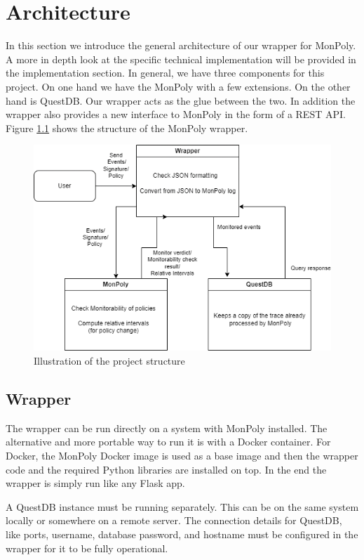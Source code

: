 \chapter{Architecture}

In this section we introduce the general architecture of our wrapper for MonPoly.
A more in depth look at the specific technical implementation will be provided in the implementation section.
In general, we have three components for this project.
On one hand we have the MonPoly with a few extensions.
On the other hand is QuestDB.
Our wrapper acts as the glue between the two.
In addition the wrapper also provides a new interface to MonPoly in the form of a REST API.
Figure \ref{fig:wrapper} shows the structure of the MonPoly wrapper.

\begin{figure}[H]
  \centering
  \includegraphics[width=130mm]{diagrams/wrapper.png}
  \caption{Illustration of the project structure}
  \label{fig:wrapper}
\end{figure}


\section{Wrapper}

The wrapper can be run directly on a system with MonPoly installed.
The alternative and more portable way to run it is with a Docker container.
For Docker, the MonPoly Docker image is used as a base image and then the wrapper code and the required Python libraries are installed on top.
In the end the wrapper is simply run like any Flask app.

A QuestDB instance must be running separately.
This can be on the same system locally or somewhere on a remote server.
The connection details for QuestDB, like ports, username, database password, and hostname must be configured in the wrapper for it to be fully operational.

